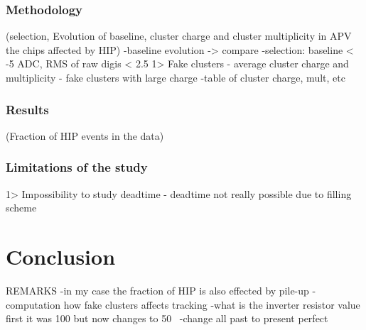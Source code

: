 \subsubsection{Methodology}
        (selection, Evolution of baseline, cluster charge and cluster multiplicity in APV the chips affected by HIP)
-baseline evolution -> compare
-selection: baseline < -5 ADC, RMS of raw digis < 2.5
         1> Fake clusters
- average cluster charge and multiplicity - fake clusters with large charge
-table of cluster charge, mult, etc
\subsubsection{Results}
      (Fraction of HIP events in the data)

\subsubsection{Limitations of the study}
         1> Impossibility to study deadtime
- deadtime not really possible due to filling scheme

\section{Conclusion}




REMARKS
-in my case the fraction of HIP is also effected by pile-up
-computation how fake clusters affects tracking
-what is the inverter resistor value first it was 100 but now changes to 50~\cite{Gennai:2003as}
-change all past to present perfect

